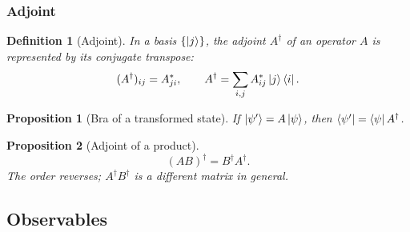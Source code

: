 \documentclass{article}
\newtheorem{definition}{Definition}
\newtheorem{proposition}{Proposition}
\begin{document}
\subsubsection{Adjoint}
\begin{definition}[Adjoint]
    In a basis $\{\ket{j}\}$, the adjoint $A^\dagger$ of an operator $A$ is represented by its conjugate transpose:
    \begin{equation}
        (A^\dagger)_{ij} = A_{ji}^*, \qquad A^\dagger = \sum_{i,j}A_{ij}^*\ket{j}\bra{i}.
    \end{equation}
\end{definition}
\begin{proposition}[Bra of a transformed state]
    If $\ket{\psi'} = A\ket{\psi}$, then $\bra{\psi'} = \bra{\psi}A^\dagger$.
\end{proposition}
\begin{proposition}[Adjoint of a product]
    \begin{equation}
        \left(AB\right)^\dagger = B^\dagger A^\dagger.
    \end{equation}
    The order reverses; $A^\dagger B^\dagger$ is a different matrix in general.
\end{proposition}

\subsection{Observables}
\end{document}
